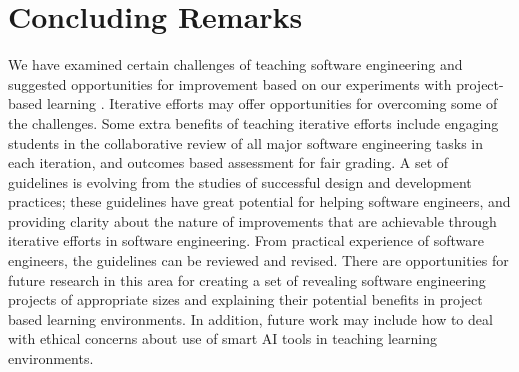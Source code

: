\documentclass{article}
\begin{document}
\section{Concluding Remarks}
We have examined certain challenges of teaching software engineering and suggested opportunities for improvement based on our experiments with project-based learning \cite{guo}. Iterative efforts may offer opportunities for overcoming some of the challenges. Some extra benefits of teaching iterative efforts include engaging students in the collaborative review of all major software engineering tasks in each iteration, and outcomes based assessment for fair grading. A set of guidelines is evolving from the studies of successful design and development practices; these guidelines have great potential for helping software engineers, and providing clarity about the nature of improvements that are achievable through iterative efforts in software engineering. From practical experience of software engineers, the guidelines can be reviewed and revised.  There are opportunities for future research in this area for creating a set of revealing software engineering projects of appropriate sizes and explaining their potential benefits in project based learning environments.  In addition, future work may include how to deal with ethical concerns about use of smart AI tools in teaching learning environments.    

\medskip



\end{document}

